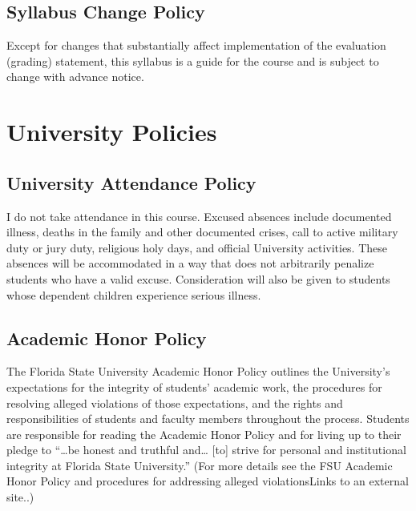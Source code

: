 \documentclass[10pt,]{article}
\begin{document}
\hypertarget{syllabus-change-policy}{%
\subsection{Syllabus Change Policy}\label{syllabus-change-policy}}

Except for changes that substantially affect implementation of the
evaluation (grading) statement, this syllabus is a guide for the course
and is subject to change with advance notice.

\hypertarget{university-policies}{%
\section{University Policies}\label{university-policies}}

\hypertarget{university-attendance-policy}{%
\subsection{University Attendance
Policy}\label{university-attendance-policy}}

I do not take attendance in this course. Excused absences include
documented illness, deaths in the family and other documented crises,
call to active military duty or jury duty, religious holy days, and
official University activities. These absences will be accommodated in a
way that does not arbitrarily penalize students who have a valid excuse.
Consideration will also be given to students whose dependent children
experience serious illness.

\hypertarget{academic-honor-policy}{%
\subsection{Academic Honor Policy}\label{academic-honor-policy}}

The Florida State University Academic Honor Policy outlines the
University's expectations for the integrity of students' academic work,
the procedures for resolving alleged violations of those expectations,
and the rights and responsibilities of students and faculty members
throughout the process. Students are responsible for reading the
Academic Honor Policy and for living up to their pledge to ``\ldots{}be
honest and truthful and\ldots{} {[}to{]} strive for personal and
institutional integrity at Florida State University.'' (For more details
see the FSU Academic Honor Policy and procedures for addressing alleged
violationsLinks to an external site..)
\end{document}
